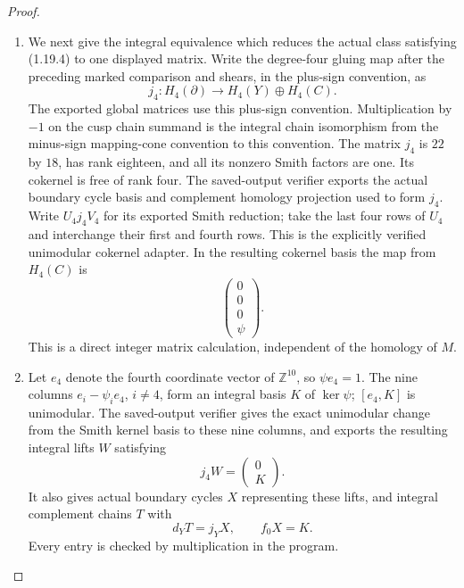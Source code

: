 \begin{proof}
\begin{enumerate}[label=\arabic*.]
\item We next give the integral equivalence which reduces the actual class
satisfying (1.19.4) to one displayed matrix. Write the degree-four
gluing map after the preceding marked comparison and shears, in the
plus-sign convention, as
\[
 j_4:H_4(\partial)\longrightarrow H_4(Y)\oplus H_4(C).
\]
The exported global matrices use this plus-sign convention.
Multiplication by $-1$ on the cusp chain summand is the integral
chain isomorphism from the minus-sign mapping-cone convention to
this convention.  The matrix $j_4$ is $22$ by $18$,
has rank eighteen, and all its nonzero Smith factors are one.
Its cokernel is free of rank four.  The saved-output verifier exports
the actual boundary cycle basis and complement homology projection
used to form $j_4$.  Write $U_4j_4V_4$ for its exported Smith reduction;
take the last four rows of $U_4$ and interchange their first and
fourth rows.  This is the explicitly verified unimodular cokernel
adapter.  In the resulting cokernel basis the map from $H_4(C)$ is
\[
 \begin{pmatrix}0\\0\\0\\\psi\end{pmatrix}.
\tag{1.19.5}
\]
This is a direct integer matrix calculation, independent of the
homology of $M$.

\item Let $e_4$ denote the fourth coordinate vector of $\mathbb Z^{10}$,
so $\psi e_4=1$.  The nine columns
$e_i-\psi_i e_4$, $i\ne4$, form an integral basis $K$ of $\ker\psi$;
$[e_4,K]$ is unimodular.  The saved-output verifier gives the exact
unimodular change from the Smith kernel basis to these nine columns,
and exports the resulting integral lifts $W$ satisfying
\[
 j_4W=\begin{pmatrix}0\\K\end{pmatrix}.
\]
It also gives actual boundary cycles $X$ representing these lifts,
and integral complement chains $T$ with
\[
 d_YT=j_YX,\qquad f_0X=K.
\tag{1.19.6}
\]
Every entry is checked by multiplication in the program.


\end{enumerate}
\end{proof}
